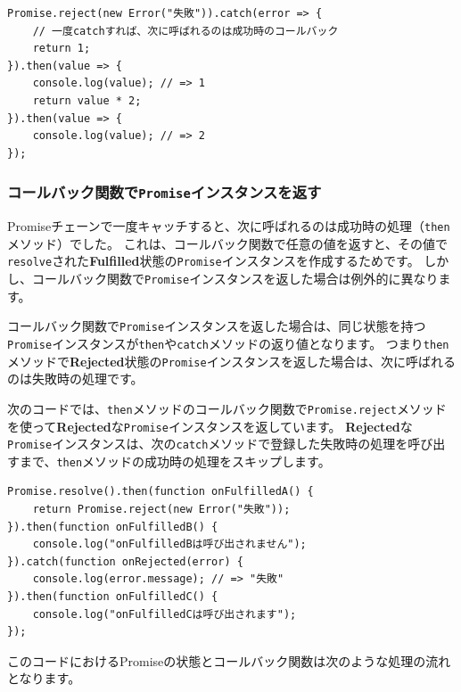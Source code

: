 \begin{lstlisting}
Promise.reject(new Error("失敗")).catch(error => { 
    // 一度catchすれば、次に呼ばれるのは成功時のコールバック
    return 1;
}).then(value => {
    console.log(value); // => 1
    return value * 2;
}).then(value => {
    console.log(value); // => 2
});
\end{lstlisting}

\hypertarget{promise-then-return-promise}{%
\subsubsection{\texorpdfstring{コールバック関数で\texttt{Promise}インスタンスを返す}{コールバック関数でPromiseインスタンスを返す}}\label{promise-then-return-promise}}

Promiseチェーンで一度キャッチすると、次に呼ばれるのは成功時の処理（\texttt{then}メソッド）でした。
これは、コールバック関数で任意の値を返すと、その値で\texttt{resolve}された\textbf{Fulfilled}状態の\texttt{Promise}インスタンスを作成するためです。
しかし、コールバック関数で\texttt{Promise}インスタンスを返した場合は例外的に異なります。

コールバック関数で\texttt{Promise}インスタンスを返した場合は、同じ状態を持つ\texttt{Promise}インスタンスが\texttt{then}や\texttt{catch}メソッドの返り値となります。
つまり\texttt{then}メソッドで\textbf{Rejected}状態の\texttt{Promise}インスタンスを返した場合は、次に呼ばれるのは失敗時の処理です。

次のコードでは、\texttt{then}メソッドのコールバック関数で\texttt{Promise.reject}メソッドを使って\textbf{Rejected}な\texttt{Promise}インスタンスを返しています。
\textbf{Rejected}な\texttt{Promise}インスタンスは、次の\texttt{catch}メソッドで登録した失敗時の処理を呼び出すまで、\texttt{then}メソッドの成功時の処理をスキップします。

\begin{lstlisting}
Promise.resolve().then(function onFulfilledA() {
    return Promise.reject(new Error("失敗"));
}).then(function onFulfilledB() {
    console.log("onFulfilledBは呼び出されません");
}).catch(function onRejected(error) {
    console.log(error.message); // => "失敗"
}).then(function onFulfilledC() {
    console.log("onFulfilledCは呼び出されます");
});
\end{lstlisting}

このコードにおけるPromiseの状態とコールバック関数は次のような処理の流れとなります。

